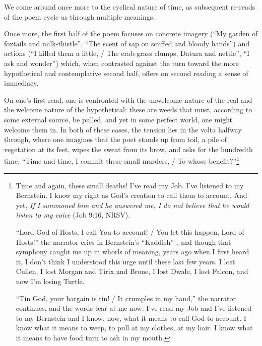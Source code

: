 \documentclass[12pt,oneside]{memoir}
\begin{document}
We come around once more to the cyclical nature of time, as subsequent re-reads of the poem cycle us through multiple meanings.

Once more, the first half of the poem focuses on concrete imagery (``My garden of foxtails and milk-thistle'', ``The scent of sap on scuffed and bloody hands'') and actions (``I killed them a little, / The crab-grass clumps, Datura and nettle'', ``I ask and wonder'') which, when contrasted against the turn toward the more hypothetical and contemplative second half, offers on second reading a sense of immediacy.

On one's first read, one is confronted with the unwelcome nature of the real and the welcome nature of the hypothetical: these are weeds that must, according to some external source, be pulled, and yet in some perfect world, one might welcome them in. In both of these cases, the tension lies in the volta halfway through, where one imagines that the poet stands up from toil, a pile of vegetation at its feet, wipes the sweat from its brow, and asks for the hundredth time, ``Time and time, I commit these small murders, / To whose benefit?''\footnote{Time and again, these small deaths! I've read my Job. I've listened to my Bernstein. I know my right as God's creation to call them to account. And yet, \emph{If I summoned him and he answered me, I do not believe that he would listen to my voice} (Job 9:16, NRSV).\par
``Lord God of Hosts, I call You to account! / You let this happen, Lord of Hosts!'' the narrator cries in Bernstein's ``Kaddish'' \parencite{kaddish}, and though that symphony caught me up in whorls of meaning, years ago when I first heard it, I don't think I understood this urge until these last few years. I lost Cullen, I lost Morgan and Tirix and Brone, I lost Dwale, I lost Falcon, and now I'm losing Turtle.\par
``Tin God, your bargain is tin! / It crumples in my hand,'' the narrator continues, and the words tear at me now. I've read my Job and I've listened to my Bernstein and I know, now, what it means to call God to account. I know what it means to weep, to pull at my clothes, at my hair. I know what it means to have food turn to ash in my mouth.}
\end{document}
